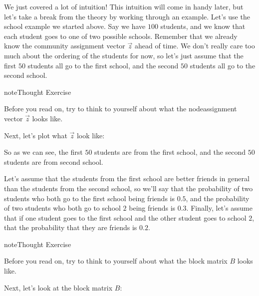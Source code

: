 \documentclass[letterpaper,10pt,english]{jupyterBook}
\begin{document}
\sphinxAtStartPar
We just covered a lot of intuition! This intuition will come in handy later, but let’s take a break from the theory by working through an example. Let’s use the school example we started above. Say we have \(100\) students, and we know that each student goes to one of two possible schools. Remember that we already know the community assignment vector \(\vec{z}\) ahead of time. We don’t really care too much about the ordering of the students for now, so let’s just assume that the first \(50\) students all go to the first school, and the second \(50\) students all go to the second school.

\begin{sphinxadmonition}{note}{Thought Exercise}

\sphinxAtStartPar
Before you read on, try to think to yourself about what the node\sphinxhyphen{}assignment vector \(\vec z\) looks like.
\end{sphinxadmonition}

\sphinxAtStartPar
Next, let’s plot what \(\vec z\) look like:

\noindent{}

\sphinxAtStartPar
So as we can see, the first \(50\) students are from the first school, and the second \(50\) students are from second school.

\sphinxAtStartPar
Let’s assume that the students from the first school are better friends in general than the students from the second school, so we’ll say that the probability of two students who both go to the first school being friends is \(0.5\), and the probability of two students who both go to school \(2\) being friends is \(0.3\). Finally, let’s assume that if one student goes to the first school and the other student goes to school \(2\), that the probability that they are friends is \(0.2\).

\begin{sphinxadmonition}{note}{Thought Exercise}

\sphinxAtStartPar
Before you read on, try to think to yourself about what the block matrix \(B\) looks like.
\end{sphinxadmonition}

\sphinxAtStartPar
Next, let’s look at the block matrix \(B\):

\begin{sphinxVerbatim}[commandchars=\\\{\}]
    
  \PYG{p}{[}\PYG{p}{[} \PYG{p}{]} 
     \PYG{p}{[} \PYG{p}{]}\PYG{p}{]}
\end{sphinxVerbatim}
\end{document}

